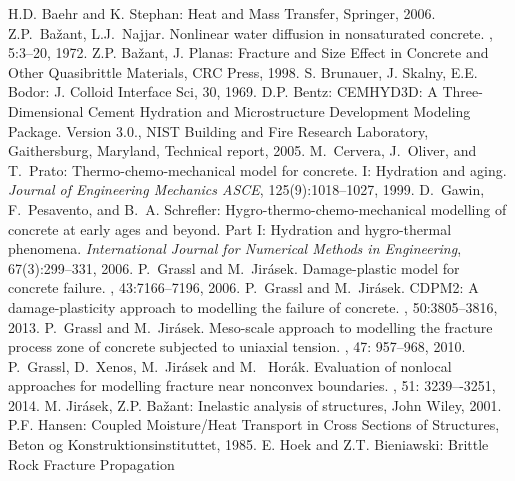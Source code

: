 \documentclass[a4paper]{article}
\begin{document}
\begin{thebibliography}{99}
 H.D. Baehr and K. Stephan: Heat and Mass Transfer, Springer, 2006.
 Z.P.~Ba\v{z}ant, L.J.~Najjar.
\newblock  Nonlinear water diffusion in nonsaturated concrete.
, 5:3--20, 1972.
 Z.P. Ba\v{z}ant, J. Planas: Fracture and Size
  Effect in Concrete and Other Quasibrittle  Materials, CRC Press,
  1998.
 S. Brunauer, J. Skalny, E.E. Bodor: J. Colloid Interface
  Sci, 30, 1969.
 D.P. Bentz: CEMHYD3D: A Three-Dimensional Cement Hydration and Microstructure Development Modeling Package. Version 3.0., NIST Building and Fire Research Laboratory, Gaithersburg, Maryland, Technical report, 2005.
 M.~Cervera, J.~Oliver, and T.~Prato: Thermo-chemo-mechanical model for concrete. I: Hydration and aging. {\em Journal of Engineering Mechanics ASCE}, 125(9):1018--1027, 1999.
 D.~Gawin, F.~Pesavento, and B.~A. Schrefler: Hygro-thermo-chemo-mechanical modelling of concrete at early ages and beyond. Part I: Hydration and hygro-thermal phenomena. {\em International Journal for Numerical Methods in Engineering}, 67(3):299--331, 2006.
 P.~Grassl and M.~Jir\'{a}sek.
\newblock Damage-plastic model for concrete failure.
, 43:7166--7196, 2006.
 P.~Grassl and M.~Jir\'{a}sek.
\newblock CDPM2: A damage-plasticity approach to modelling the failure of concrete.
, 50:3805--3816, 2013.
 P.~Grassl and M.~Jir\'{a}sek.
\newblock Meso-scale approach to modelling the fracture process zone of concrete subjected to uniaxial tension.
, 47: 957--968, 2010.
 P.~Grassl, D.~Xenos, M.~Jir\'{a}sek and M.~ Hor\'{a}k.
\newblock  Evaluation of nonlocal approaches for modelling fracture near nonconvex boundaries.
, 51: 3239–-3251, 2014.
 M. Jir\'asek, Z.P. Ba\v zant: Inelastic analysis of
  structures, John Wiley, 2001.
 P.F. Hansen: Coupled Moisture/Heat Transport in
  Cross Sections of Structures, Beton og Konstruktionsinstituttet, 1985.
 E. Hoek and Z.T. Bieniawski: Brittle Rock Fracture Propagation

\end{thebibliography}
\end{document}
